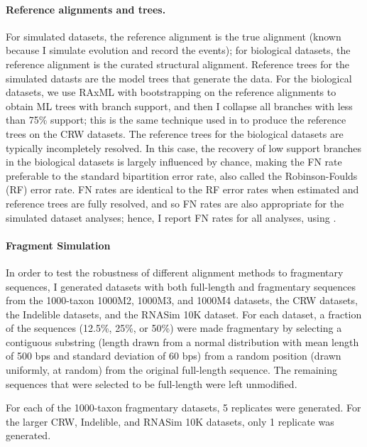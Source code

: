 \paragraph{Reference alignments and trees. }
For simulated datasets, the reference
alignment is the true alignment (known because
I simulate evolution and record the events); for
biological datasets, the reference alignment is the
curated structural alignment.
Reference trees for the simulated datasts are
the model trees that
generate the data.  For the biological datasets, we
use RAxML with bootstrapping on the reference alignments to
obtain ML 
trees with branch support,
and then I collapse all   branches with less than
75\% support;  this is the
same technique used in \cite{Liu2012} to
produce the reference trees on the CRW datasets.
The reference trees for the biological datasets 
are typically incompletely resolved.
In this case,  
the recovery of low support branches in the biological datasets is largely influenced by chance,  making
the FN rate preferable to the
standard bipartition error rate, also called the
Robinson-Foulds (RF) \cite{RF} error rate.
FN rates are identical to the RF
error rates when 
estimated and reference trees are fully resolved, and so
FN rates are also appropriate
for the simulated dataset analyses; 
hence, I report FN rates for all analyses, using
\cite{fasttree_tools}.

\paragraph{Fragment Simulation}\label{frag_simulation}

In order to test the robustness of different alignment methods to
fragmentary sequences, I generated datasets with both full-length and fragmentary sequences from the 1000-taxon 1000M2, 1000M3, and 1000M4 datasets, the CRW datasets, the Indelible datasets, and the RNASim 10K dataset.  For each dataset, a fraction of the sequences (12.5\%, 25\%, or 50\%) were made fragmentary by selecting a contiguous substring (length drawn from a normal distribution with mean length of 500 bps and standard deviation of 60 bps) from a random position (drawn uniformly, at random) from the original full-length sequence.  The remaining sequences that were selected to be full-length were left unmodified.

For each of the 1000-taxon fragmentary datasets, 5 replicates were generated.  For the larger CRW, Indelible, and RNASim 10K datasets, only 1 replicate was generated.
\clearpage

